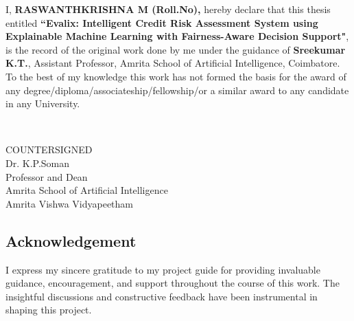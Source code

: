 \documentclass[12pt]{report}
\begin{document}
I, \textbf{RASWANTHKRISHNA M (Roll.No),} hereby declare that this thesis entitled {\sc \textbf{``Evalix: Intelligent Credit Risk Assessment System using Explainable Machine Learning with Fairness-Aware Decision Support"}}, is the record of the original work done by me under the guidance of \textbf{Sreekumar K.T.}, Assistant Professor, Amrita School of Artificial Intelligence, Coimbatore. To the best of my knowledge this work has not formed the basis for the award of any degree/diploma/associateship/fellowship/or a similar award to any candidate in any University.\\

\vspace*{.8cm}

 \\

\vspace*{1.5cm}

\begin{center}
	\large {COUNTERSIGNED}\\
	\vspace*{1.7cm}
	\small {Dr. K.P.Soman\\
		\vspace*{.1cm}
		Professor and Dean\\
		\vspace*{.1cm}
		Amrita School of Artificial Intelligence\\
		\vspace*{.1cm}
		Amrita Vishwa Vidyapeetham}
\end{center}


\newpage
\baselineskip 1cm
\tableofcontents


\newpage
\begin{center}
	\section*{Acknowledgement}
\end{center}

I express my sincere gratitude to my project guide for providing invaluable guidance, encouragement, and support throughout the course of this work. The insightful discussions and constructive feedback have been instrumental in shaping this project.
\end{document}
